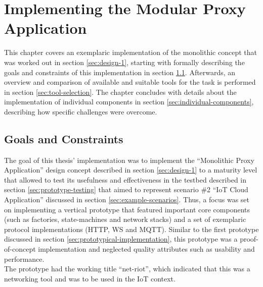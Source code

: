 \chapter{Implementing the Modular Proxy Application}
\label{chap:implementation}
This chapter covers an exemplaric implementation of the monolithic concept that was worked out in section \ref{sec:design-1}, starting with formally describing the goals and constraints of this implementation in section \ref{sec:goals-constraints}. Afterwards, an overview and comparison of available and suitable tools for the task is performed in section \ref{sec:tool-selection}. The chapter concludes with details about the implementation of individual components in section \ref{sec:individual-components}, describing how specific challenges were overcome.

\section{Goals and Constraints}
\label{sec:goals-constraints}
The goal of this thesis' implementation was to implement the \enquote{Monolithic Proxy Application} design concept described in section \ref{sec:design-1} to a maturity level that allowed to test its usefulness and effectiveness in the testbed described in section \ref{sec:prototype-testing} that aimed to represent scenario \#2 \enquote{IoT Cloud Application} discussed in section \ref{sec:example-scenarios}. Thus, a focus was set on implementing a vertical prototype that featured important core components (such as factories, state-machines and network stacks) and a set of exemplaric protocol implementations (\ac{HTTP}, \ac{WS} and \ac{MQTT}). Similar to the first prototype discussed in section \ref{sec:prototypical-implementation}, this prototype was a proof-of-concept implementation and neglected quality attributes such as usability and performance.\\
The prototype had the working title \enquote{net-riot}, which indicated that this was a networking tool and was to be used in the \ac{IoT} context.

